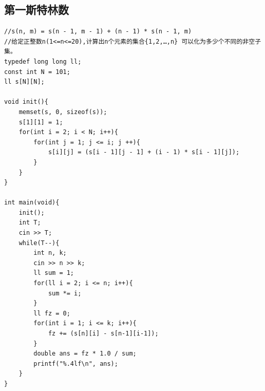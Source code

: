 \documentclass[twoside]{article}
\begin{document}
\subsection{第一斯特林数}
\begin{lstlisting}
//s(n, m) = s(n - 1, m - 1) + (n - 1) * s(n - 1, m)
//给定正整数n(1<=n<=20),计算出n个元素的集合{1,2,…,n} 可以化为多少个不同的非空子集。
typedef long long ll;
const int N = 101;
ll s[N][N];

void init(){
    memset(s, 0, sizeof(s));
    s[1][1] = 1;
    for(int i = 2; i < N; i++){
        for(int j = 1; j <= i; j ++){
            s[i][j] = (s[i - 1][j - 1] + (i - 1) * s[i - 1][j]);
        }
    }
}

int main(void){
    init();
    int T;
    cin >> T;
    while(T--){
        int n, k;
        cin >> n >> k;
        ll sum = 1;
        for(ll i = 2; i <= n; i++){
            sum *= i;
        }
        ll fz = 0;
        for(int i = 1; i <= k; i++){
            fz += (s[n][i] - s[n-1][i-1]);
        }
        double ans = fz * 1.0 / sum;
        printf("%.4lf\n", ans);
    }
}\end{lstlisting}
\end{document}
